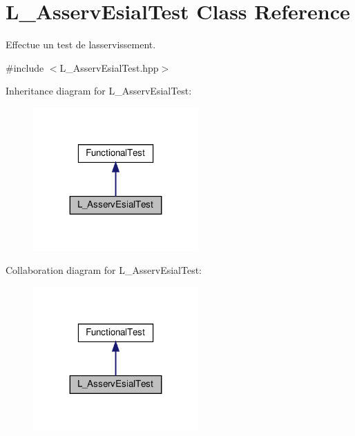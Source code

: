 \hypertarget{classL__AsservEsialTest}{}\section{L\+\_\+\+Asserv\+Esial\+Test Class Reference}
\label{classL__AsservEsialTest}


Effectue un test de l\textquotesingle{}asservissement.  




{\ttfamily \#include $<$L\+\_\+\+Asserv\+Esial\+Test.\+hpp$>$}



Inheritance diagram for L\+\_\+\+Asserv\+Esial\+Test\+:
\nopagebreak
\begin{figure}[H]
\begin{center}
\leavevmode
\includegraphics[width=179pt]{classL__AsservEsialTest__inherit__graph}
\end{center}
\end{figure}


Collaboration diagram for L\+\_\+\+Asserv\+Esial\+Test\+:
\nopagebreak
\begin{figure}[H]
\begin{center}
\leavevmode
\includegraphics[width=179pt]{classL__AsservEsialTest__coll__graph}
\end{center}
\end{figure}

